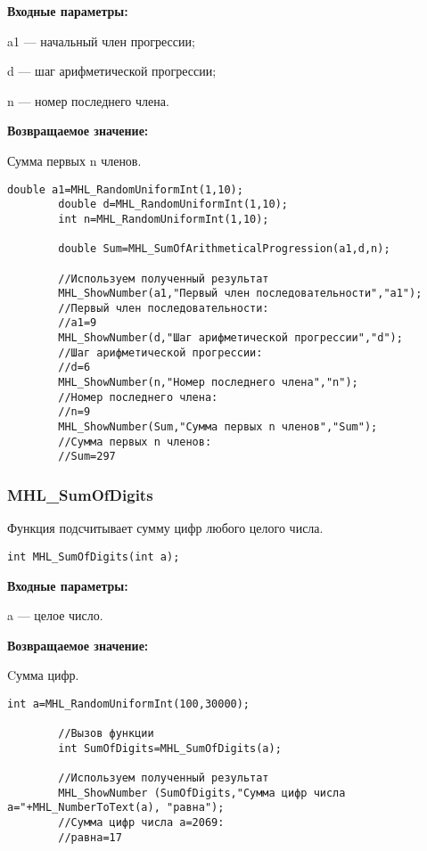 \documentclass[a4paper,12pt]{article}
\begin{document}
\textbf{Входные параметры:}  
 
 a1 --- начальный член прогрессии;
 
 d --- шаг арифметической прогрессии;
 
 n --- номер последнего члена.

\textbf{Возвращаемое значение:}
 
Сумма первых n членов.


\begin{lstlisting}[label=code_use_MHL_SumOfArithmeticalProgression,caption=Пример использования]
        double a1=MHL_RandomUniformInt(1,10);
        double d=MHL_RandomUniformInt(1,10);
        int n=MHL_RandomUniformInt(1,10);

        double Sum=MHL_SumOfArithmeticalProgression(a1,d,n);

        //Используем полученный результат
        MHL_ShowNumber(a1,"Первый член последовательности","a1");
        //Первый член последовательности:
        //a1=9
        MHL_ShowNumber(d,"Шаг арифметической прогрессии","d");
        //Шаг арифметической прогрессии:
        //d=6
        MHL_ShowNumber(n,"Номер последнего члена","n");
        //Номер последнего члена:
        //n=9
        MHL_ShowNumber(Sum,"Сумма первых n членов","Sum");
        //Сумма первых n членов:
        //Sum=297
\end{lstlisting}

\subsubsection{MHL\_SumOfDigits}\label{MHL_SumOfDigits}

Функция подсчитывает сумму цифр любого целого числа.


\begin{lstlisting}[label=code_syntax_MHL_SumOfDigits,caption=Синтаксис]
int MHL_SumOfDigits(int a);
\end{lstlisting}

\textbf{Входные параметры:}

a --- целое число.

\textbf{Возвращаемое значение:}

Cумма цифр.


\begin{lstlisting}[label=code_use_MHL_SumOfDigits,caption=Пример использования]
        int a=MHL_RandomUniformInt(100,30000);

        //Вызов функции
        int SumOfDigits=MHL_SumOfDigits(a);

        //Используем полученный результат
        MHL_ShowNumber (SumOfDigits,"Сумма цифр числа a="+MHL_NumberToText(a), "равна");
        //Сумма цифр числа a=2069:
        //равна=17
\end{lstlisting}
\end{document}
